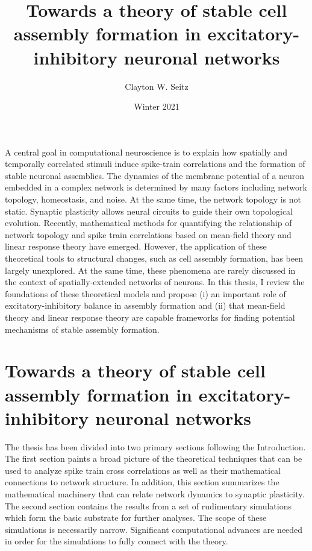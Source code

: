 \documentclass{ucetd}
\title{Towards a theory of stable cell assembly formation in excitatory-inhibitory neuronal networks}
\author{Clayton W. Seitz}
\date{Winter 2021}
\begin{document}
\maketitle

\makecopyright


\tableofcontents


\abstract

A central goal in computational neuroscience is to explain how spatially and temporally correlated stimuli induce spike-train correlations and the formation of stable neuronal assemblies. The dynamics of the membrane potential of a neuron embedded in a complex network is determined by many factors including network topology, homeostasis, and noise. At the same time, the network topology is not static. Synaptic plasticity allows neural circuits to guide their own topological evolution. Recently, mathematical methods for quantifying the relationship of network topology and spike train correlations based on mean-field theory and linear response theory have emerged. However, the application of these theoretical tools to structural changes, such as cell assembly formation, has been largely unexplored. At the same time, these phenomena are rarely discussed in the context of spatially-extended networks of neurons. In this thesis, I review the foundations of these theoretical models and propose (i) an important role of excitatory-inhibitory balance in assembly formation and (ii) that mean-field theory and linear response theory are capable frameworks for finding potential mechanisms of stable assembly formation.

\clearpage

\mainmatter

\chapter{Towards a theory of stable cell assembly formation in excitatory-inhibitory neuronal networks}

The thesis has been divided into two primary sections following the Introduction. The first section paints a broad picture of the theoretical techniques that can be used to analyze spike train cross correlations as well as their mathematical connections to network structure. In addition, this section summarizes the mathematical machinery that can relate network dynamics to synaptic plasticity. The second section contains the results from a set of rudimentary simulations which form the basic substrate for further analyses. The scope of these simulations is necessarily narrow. Significant computational advances are needed in order for the simulations to fully connect with the theory.
\end{document}
